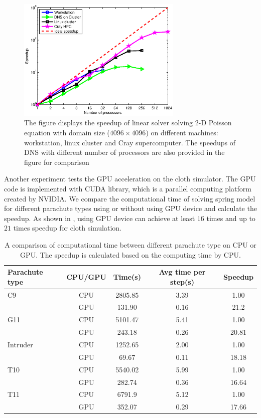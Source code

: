 \begin{figure}[!htbp]\center
\includegraphics[width=0.7\textwidth]{Figures/petsc_scaling}
\caption{The figure displays the speedup of linear solver solving 2-D Poisson equation with domain size ($4096\times 4096$) on different machines: workstation, linux cluster and Cray supercomputer. The speedups of DNS with different number of processors are also provided in the figure for comparison\label{petsc_speedup}}
\end{figure}

Another experiment tests the GPU acceleration on the cloth simulator. The GPU 
code is implemented with CUDA library, which is a parallel computing platform 
created by NVIDIA. We compare the computational time of solving spring model 
for different parachute types using or without using GPU device and calculate 
the speedup. As shown in , using GPU device can achieve at 
least $16$ times and up to $21$ times speedup for cloth simulation.  

\begin{table}[!htbp]\center
\small
\begin{tabular}{lcccc}
\hline\hline
Parachute type & CPU/GPU & Time(s) & Avg time per step(s) & Speedup\\
\hline
C9 & CPU & 2805.85 & 3.39 & 1.00 \\
{} & GPU & 131.90 & 0.16  & 21.2 \\

\hline
G11 & CPU & 5101.47 & 5.41 & 1.00 \\
{} & GPU & 243.18 & 0.26 & 20.81 \\

\hline
Intruder & CPU & 1252.65 & 2.00 & 1.00 \\
{} & GPU & 69.67 & 0.11 & 18.18 \\

\hline
T10 	& CPU & 5540.02 & 5.99 & 1.00 \\
{} & GPU & 282.74 & 0.36 & 16.64\\

\hline
T11 & CPU & 6791.9 & 5.12 & 1.00 \\
{} & GPU & 352.07 & 0.29 & 17.66\\
\hline
\end{tabular}
\caption{A comparison of computational time between different parachute type on CPU or GPU. The speedup is calculated based on the computing time by CPU. \label{gpu_speedup}}
\end{table}